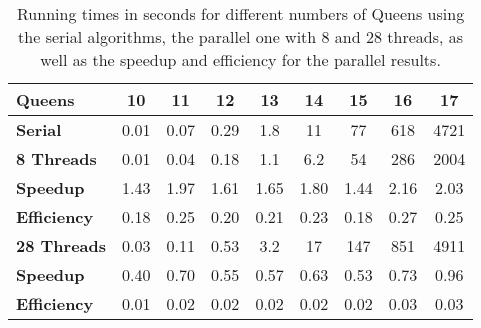 \begin{table}[!ht]
    \centering
    \begin{tabular}{l | c | c | c | c | c | c | c | c }
    \textbf{Queens}     & 10   & 11   & 12   & 13   & 14   & 15   & 16   & 17   \\ \hline\hline
    \textbf{Serial}     & 0.01 & 0.07 & 0.29 & 1.8  & 11   & 77   & 618  & 4721 \\ \hline
    \textbf{8 Threads}  & 0.01 & 0.04 & 0.18 & 1.1  & 6.2  & 54   & 286  & 2004 \\
    \textbf{Speedup}    & 1.43 & 1.97 & 1.61 & 1.65 & 1.80 & 1.44 & 2.16 & 2.03 \\
    \textbf{Efficiency} & 0.18 & 0.25 & 0.20 & 0.21 & 0.23 & 0.18 & 0.27 & 0.25 \\ \hline
    \textbf{28 Threads} & 0.03 & 0.11 & 0.53 & 3.2  & 17   & 147  & 851  & 4911 \\
    \textbf{Speedup}    & 0.40 & 0.70 & 0.55 & 0.57 & 0.63 & 0.53 & 0.73 & 0.96 \\
    \textbf{Efficiency} & 0.01 & 0.02 & 0.02 & 0.02 & 0.02 & 0.02 & 0.03 & 0.03 \\
    
    \end{tabular}
    \caption{Running times in seconds for different numbers of Queens using the serial algorithms, the parallel one with 8 and 28 threads, as well as the speedup and efficiency for the parallel results.}
    \label{tab:inc_queens}
\end{table}
